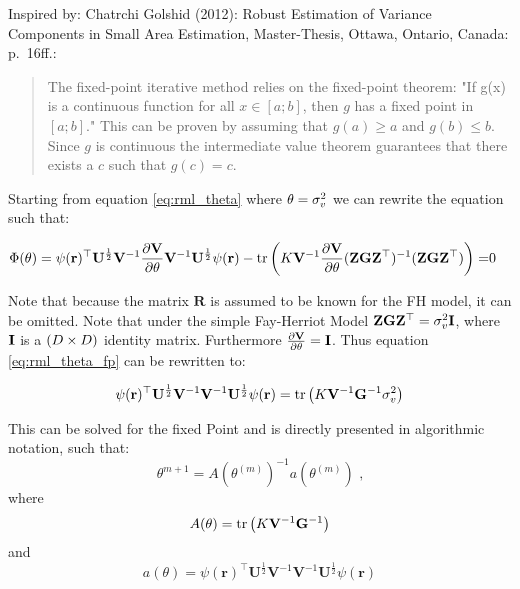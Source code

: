 Inspired by: Chatrchi Golshid (2012): Robust Estimation of Variance
Components in Small Area Estimation, Master-Thesis, Ottawa, Ontario,
Canada: p.~16ff.:

\begin{quote}
The fixed-point iterative method relies on the fixed-point theorem: "If g(x) is
a continuous function for all $x \in [a; b]$, then $g$ has a fixed point in $[a;
b]$." This can be proven by assuming that $g(a)\geq a$ and $g(b)\leq b$. Since
$g$ is continuous the intermediate value theorem guarantees that there exists a
$c$ such that $g(c) = c$.
\end{quote}

Starting from equation \ref{eq:rml_theta} where
$\theta = \sigma_v^2$ we can rewrite the equation such that:

\begin{align}
\label{eq:rml_theta_fp}
\Phi(\theta) = \psi(\mathbf{r})^\top \mathbf{U}^{\frac{1}{2}}\mathbf{V}^{-1}\frac{\partial\mathbf{V}}{\partial\theta}\mathbf{V}^{-1}\mathbf{U}^{\frac{1}{2}} \psi(\mathbf{r}) - \operatorname{tr}\left(K\mathbf{V}^{-1}\frac{\partial\mathbf{V}}{\partial\theta} (\mathbf{Z}\mathbf{G}\mathbf{Z}^\top)^{-1} (\mathbf{Z}\mathbf{G}\mathbf{Z}^\top)\right) =& 0
\end{align}

Note that because the matrix $\mathbf{R}$ is assumed to be known for the
FH model, it can be omitted. Note that under the simple Fay-Herriot
Model
$\mathbf{Z}\mathbf{G}\mathbf{Z}^\top = \sigma_v^2\mathbf{I}$,
where $\mathbf{I}$ is a $(D \times D)$ identity
matrix. Furthermore
$\frac{\partial\mathbf{V}}{\partial\theta} = \mathbf{I}$. Thus
equation \ref{eq:rml_theta_fp} can be rewritten to:

\begin{align*}
\psi(\mathbf{r})^\top\mathbf{U}^{\frac{1}{2}}\mathbf{V}^{-1}\mathbf{V}^{-1}\mathbf{U}^{\frac{1}{2}} \psi(\mathbf{r}) = \operatorname{tr}\left(K\mathbf{V}^{-1}\mathbf{G}^{-1} \sigma_v^2 \right)
\end{align*}

This can be solved for the fixed Point and is directly presented in
algorithmic notation, such that: \[
\theta^{m+1} = A(\theta^{(m)})^{-1} a(\theta^{(m)}) \text{ ,}
\] where \[
A(\theta) = \operatorname{tr}\left(K\mathbf{V}^{-1}\mathbf{G}^{-1} \right)
\] and
\[a(\theta) = \psi(\mathbf{r})^\top\mathbf{U}^{\frac{1}{2}}\mathbf{V}^{-1}\mathbf{V}^{-1}\mathbf{U}^{\frac{1}{2}} \psi(\mathbf{r})
\]
